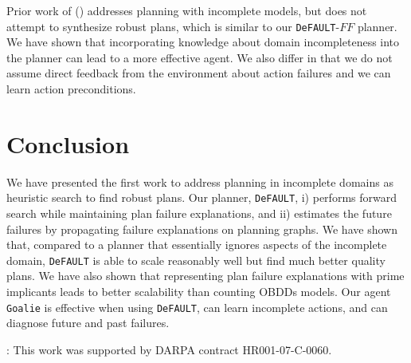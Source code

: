 \documentclass[letterpaper]{article}
\def\und#1{\noindent{\bf #1}:}
\def\FFRISKY{{\tt DeFAULT}}
\def\goalie{{\tt Goalie}}
\def\citep#1{\cite{#1}}
\def\citet#1{\citeauthor{#1} (\citeyear{#1})}
\begin{document}
Prior work of \citet{DBLP:conf/aips/ChangA06} addresses planning with incomplete models, but does not attempt to synthesize robust plans, which is similar to our \FFRISKY{}-$FF$ planner.  We have shown that incorporating knowledge about domain incompleteness into the planner can lead to a more effective agent.  We also differ in that we do not assume direct feedback from the environment about action failures and we can learn action preconditions.

\section{Conclusion}

We have presented the first work to address planning in incomplete domains as
heuristic search to find robust plans.  Our planner, \FFRISKY{}, i) performs
forward search while maintaining plan failure explanations, and ii) estimates
the future failures by propagating failure explanations on planning graphs.  We
have shown that, compared to a planner that essentially ignores aspects of the
incomplete domain, \FFRISKY{} is able to scale reasonably well but find much
better quality plans.  We have also shown that representing plan failure
explanations with prime implicants leads to better scalability than counting
OBDDs models.  Our agent \goalie{} is  effective when using \FFRISKY{}, can learn  incomplete
actions, and can diagnose future and past failures.


\und{Acknowledgements} This work was supported by DARPA contract HR001-07-C-0060.


 
\end{document}

